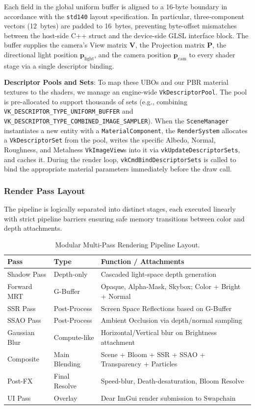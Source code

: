 \documentclass[acmtog, nonacm]{acmart}
\begin{document}
Each field in the global uniform buffer is aligned to a 16-byte boundary in accordance with the \texttt{std140} layout specification. In particular, three-component vectors (12~bytes) are padded to 16~bytes, preventing byte-offset mismatches between the host-side C++ struct and the device-side GLSL interface block. The buffer supplies the camera's View matrix $\mathbf{V}$, the Projection matrix $\mathbf{P}$, the directional light position $\mathbf{p}_{\text{light}}$, and the camera position $\mathbf{p}_{\text{cam}}$ to every shader stage via a single descriptor binding.

\textbf{Descriptor Pools and Sets}: To map these UBOs and our PBR material textures to the shaders, we manage an engine-wide \texttt{VkDescriptorPool}. The pool is pre-allocated to support thousands of sets (e.g., combining \texttt{VK\_DESCRIPTOR\_TYPE\_UNIFORM\_BUFFER} and \texttt{VK\_DESCRIPTOR\_TYPE\_COMBINED\_IMAGE\_SAMPLER}). When the \texttt{SceneManager} instantiates a new entity with a \texttt{MaterialComponent}, the \texttt{RenderSystem} allocates a \texttt{VkDescriptorSet} from the pool, writes the specific Albedo, Normal, Roughness, and Metalness \texttt{VkImageView}s into it via \texttt{vkUpdateDescriptorSets}, and caches it. During the render loop, \texttt{vkCmdBindDescriptorSets} is called to bind the appropriate material parameters immediately before the draw call.

\subsubsection{Render Pass Layout}
The pipeline is logically separated into distinct stages, each executed linearly with strict pipeline barriers ensuring safe memory transitions between color and depth attachments.

\begin{table}[h]
\centering
\small
\begin{tabular}{|l|l|p{3.8cm}|}
\hline
\textbf{Pass} & \textbf{Type} & \textbf{Function / Attachments} \\ \hline
Shadow Pass & Depth-only & Cascaded light-space depth generation \\ \hline
Forward MRT & G-Buffer & Opaque, Alpha-Mask, Skybox; Color + Bright + Normal \\ \hline
SSR Pass & Post-Process & Screen Space Reflections based on G-Buffer \\ \hline
SSAO Pass & Post-Process & Ambient Occlusion via depth/normal sampling \\ \hline
Gaussian Blur & Compute-like & Horizontal/Vertical blur on Brightness attachment \\ \hline
Composite & Main Blending & Scene + Bloom + SSR + SSAO + Transparency + Particles \\ \hline
Post-FX & Final Resolve & Speed-blur, Death-desaturation, Bloom Resolve \\ \hline
UI Pass & Overlay & Dear ImGui render submission to Swapchain \\ \hline
\end{tabular}
\caption{Modular Multi-Pass Rendering Pipeline Layout.}
\label{tab:render_passes}
\end{table}
\end{document}
